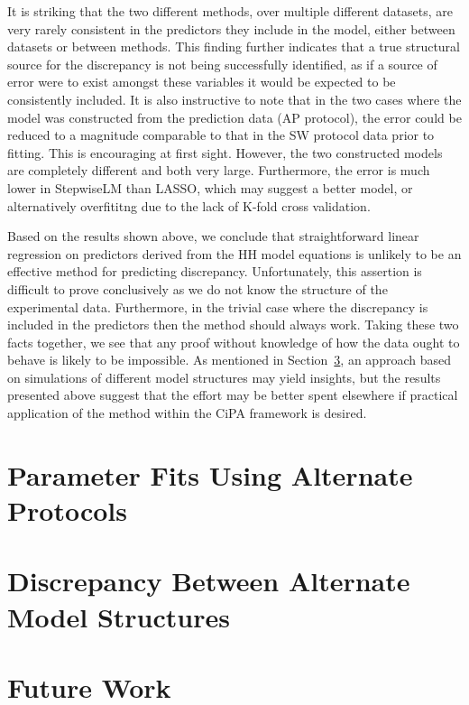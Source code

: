 \documentclass[11pt,a4paper,oneside]{article}
\begin{document}
It is striking that the two different methods, over multiple different datasets, are very rarely consistent in the predictors they include in the model, either between datasets or between methods. This finding further indicates that a true structural source for the discrepancy is not being successfully identified, as if a source of error were to exist amongst these variables it would be expected to be consistently included. It is also instructive to note that in the two cases where the model was constructed from the prediction data (AP protocol), the error could be reduced to a magnitude comparable to that in the SW protocol data prior to fitting. This is encouraging at first sight. However, the two constructed models are completely different and both very large. Furthermore, the error is much lower in StepwiseLM than LASSO, which may suggest a better model, or alternatively overfititng due to the lack of K-fold cross validation.

Based on the results shown above, we conclude that straightforward linear regression on predictors derived from the HH model equations is unlikely to be an effective method for predicting discrepancy. Unfortunately, this assertion is difficult to prove conclusively as we do not know the structure of the experimental data. Furthermore, in the trivial case where the discrepancy is included in the predictors then the method should always work. Taking these two facts together, we see that any proof without knowledge of how the data ought to behave is likely to be impossible. As mentioned in Section~\ref{Sec_FutureWork}, an approach based on simulations of different model structures may yield insights, but the results presented above suggest that the effort may be better spent elsewhere if practical application of the method within the CiPA framework is desired. 

\section{Parameter Fits Using Alternate Protocols}

\section{Discrepancy Between Alternate Model Structures}

\section{Future Work}\label{Sec_FutureWork}
\end{document}
